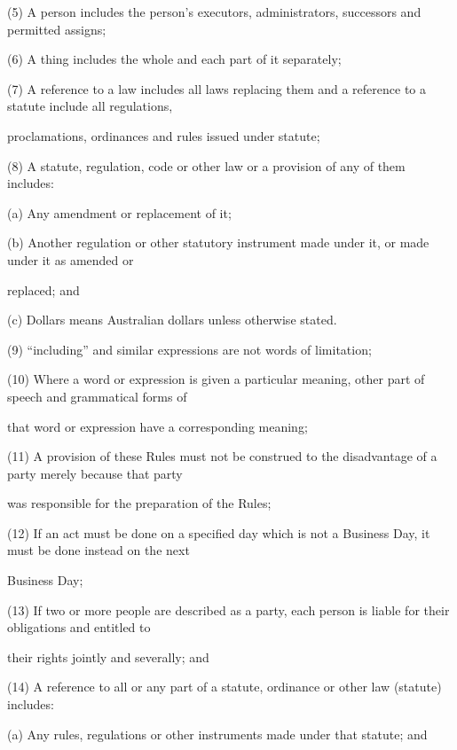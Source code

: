 \documentclass{article}
\begin{document}
{\fontsize{9.962}{1}(5) A person includes the person’s executors, administrators, successors and permitted assigns; }

{\fontsize{9.962}{1}(6) A thing includes the whole and each part of it separately; }

{\fontsize{9.962}{1}(7) A reference to a law includes all laws replacing them and a reference to a statute include all regulations, }

{\fontsize{10.02}{1}proclamations, ordinances and rules issued under statute; }

{\fontsize{9.962}{1}(8) A statute, regulation, code or other law or a provision of any of them includes: }

{\fontsize{9.962}{1}(a) Any amendment or replacement of it; }

{\fontsize{9.962}{1}(b) Another regulation or other statutory instrument made under it, or made under it as amended or }

{\fontsize{10.02}{1}replaced; and }

{\fontsize{9.962}{1}(c) Dollars means Australian dollars unless otherwise stated. }

{\fontsize{9.962}{1}(9) “including” and similar expressions are not words of limitation; }

{\fontsize{9.962}{1}(10) Where a word or expression is given a particular meaning, other part of speech and grammatical forms of }

{\fontsize{10.02}{1}that word or expression have a corresponding meaning; }

{\fontsize{9.962}{1}(11) A provision of these Rules must not be construed to the disadvantage of a party merely because that party }

{\fontsize{10.02}{1}was responsible for the preparation of the Rules; }

{\fontsize{9.962}{1}(12) If an act must be done on a specified day which is not a Business Day, it must be done instead on the next }

{\fontsize{10.02}{1}Business Day; }

{\fontsize{9.962}{1}(13) If two or more people are described as a party, each person is liable for their obligations and entitled to }

{\fontsize{10.02}{1}their rights jointly and severally; and }

{\fontsize{9.962}{1}(14) A reference to all or any part of a statute, ordinance or other law (statute) includes: }

{\fontsize{9.962}{1}(a) Any rules, regulations or other instruments made under that statute; and }
\end{document}
